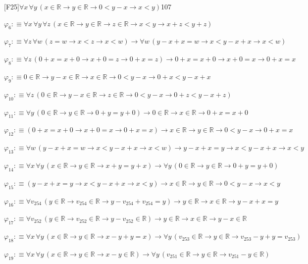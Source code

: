 \begin{fullproof}{[F25]}{$\forall x\,\forall y\,(x \in \mathbb{R} \to y \in \mathbb{R} \to 0 < y - x \to x < y)$}{107}
\begin{abbrevlist}
\item $\varphi_{6} :\equiv \forall x\,\forall y\,\forall z\,(x \in \mathbb{R} \to y \in \mathbb{R} \to z \in \mathbb{R} \to x < y \to x + z < y + z)$
\item $\varphi_{7} :\equiv \forall z\,\forall w\,(z = w \to x < z \to x < w) \to \forall w\,(y - x + x = w \to x < y - x + x \to x < w)$
\item $\varphi_{8} :\equiv \forall z\,(0 + x = x + 0 \to x + 0 = z \to 0 + x = z) \to 0 + x = x + 0 \to x + 0 = x \to 0 + x = x$
\item $\varphi_{9} :\equiv 0 \in \mathbb{R} \to y - x \in \mathbb{R} \to x \in \mathbb{R} \to 0 < y - x \to 0 + x < y - x + x$
\item $\varphi_{10} :\equiv \forall z\,(0 \in \mathbb{R} \to y - x \in \mathbb{R} \to z \in \mathbb{R} \to 0 < y - x \to 0 + z < y - x + z)$
\item $\varphi_{11} :\equiv \forall y\,(0 \in \mathbb{R} \to y \in \mathbb{R} \to 0 + y = y + 0) \to 0 \in \mathbb{R} \to x \in \mathbb{R} \to 0 + x = x + 0$
\item $\varphi_{12} :\equiv (0 + x = x + 0 \to x + 0 = x \to 0 + x = x) \to x \in \mathbb{R} \to y \in \mathbb{R} \to 0 < y - x \to 0 + x = x$
\item $\varphi_{13} :\equiv \forall w\,(y - x + x = w \to x < y - x + x \to x < w) \to y - x + x = y \to x < y - x + x \to x < y$
\item $\varphi_{14} :\equiv \forall x\,\forall y\,(x \in \mathbb{R} \to y \in \mathbb{R} \to x + y = y + x) \to \forall y\,(0 \in \mathbb{R} \to y \in \mathbb{R} \to 0 + y = y + 0)$
\item $\varphi_{15} :\equiv (y - x + x = y \to x < y - x + x \to x < y) \to x \in \mathbb{R} \to y \in \mathbb{R} \to 0 < y - x \to x < y$
\item $\varphi_{16} :\equiv \forall v_{254}\,(y \in \mathbb{R} \to v_{254} \in \mathbb{R} \to y - v_{254} + v_{254} = y) \to y \in \mathbb{R} \to x \in \mathbb{R} \to y - x + x = y$
\item $\varphi_{17} :\equiv \forall v_{252}\,(y \in \mathbb{R} \to v_{252} \in \mathbb{R} \to y - v_{252} \in \mathbb{R}) \to y \in \mathbb{R} \to x \in \mathbb{R} \to y - x \in \mathbb{R}$
\item $\varphi_{18} :\equiv \forall x\,\forall y\,(x \in \mathbb{R} \to y \in \mathbb{R} \to x - y + y = x) \to \forall y\,(v_{253} \in \mathbb{R} \to y \in \mathbb{R} \to v_{253} - y + y = v_{253})$
\item $\varphi_{19} :\equiv \forall x\,\forall y\,(x \in \mathbb{R} \to y \in \mathbb{R} \to x - y \in \mathbb{R}) \to \forall y\,(v_{251} \in \mathbb{R} \to y \in \mathbb{R} \to v_{251} - y \in \mathbb{R})$

\end{abbrevlist}
\end{fullproof}
